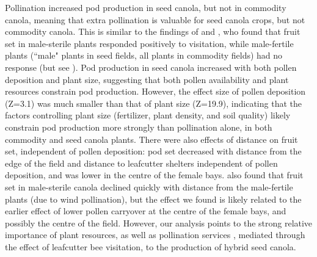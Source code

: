 \documentclass[12pt]{article} %
\begin{document}
Pollination increased pod production in seed canola, but not in commodity canola, meaning that extra pollination is valuable for seed canola crops, but not commodity canola. 
This is similar to the findings of \citet{mesquida1981} and \citet{steffan2003}, who found that fruit set in male-sterile plants responded positively to visitation, while male-fertile plants (``male" plants in seed fields, all plants in commodity fields) had no response (but see \citealp{adegas1992}).
Pod production in seed canola increased with both pollen deposition and plant size, suggesting that both pollen availability and plant resources constrain pod production. %
However, the effect size of pollen deposition (Z=3.1) was much smaller than that of plant size (Z=19.9), indicating that the factors controlling plant size (fertilizer, plant density, and soil quality) likely constrain pod production more strongly than pollination alone, in both commodity and seed canola plants. %
There were also effects of distance on fruit set, independent of pollen deposition: pod set decreased with distance from the edge of the field and distance to leafcutter shelters independent of pollen deposition, and was lower in the centre of the female bays.
\citet{mesquida1978} also found that fruit set in male-sterile canola declined quickly with distance from the male-fertile plants (due to wind pollination), but the effect we found is likely related to the earlier effect of lower pollen carryover at the centre of the female bays, and possibly the centre of the field.
However, our analysis points to the strong relative importance of plant resources, as well as pollination services \citep{marini2015}, mediated through the effect of leafcutter bee visitation, to the production of hybrid seed canola. 
\end{document}
